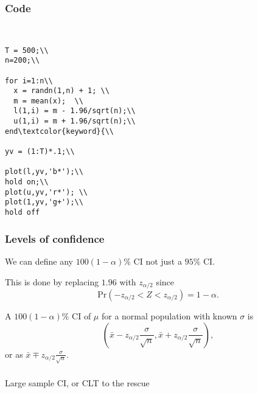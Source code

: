 \begin{frame}[fragile]\frametitle{Code}

{\tiny

\begin{lstlisting}


T = 500;\\
n=200;\\

for i=1:n\\
  x = randn(1,n) + 1; \\
  m = mean(x);  \\
  l(1,i) = m - 1.96/sqrt(n);\\
  u(1,i) = m + 1.96/sqrt(n);\\
end\textcolor{keyword}{\\

yv = (1:T)*.1;\\

plot(l,yv,'b*');\\
hold on;\\
plot(u,yv,'r*'); \\
plot(1,yv,'g+');\\
hold off

\end{lstlisting}

}

\end{frame}


\begin{frame}[fragile]\frametitle{Levels of confidence}

We can define any $100 (1-\alpha) \%$ CI not just a $95\%$ CI. \\ 

\vspace{.1in}

This is done by replacing $1.96$ with $z_{\alpha/2}$  since
$$\mbox{Pr}\left(-z_{\alpha/2} < Z < z_{\alpha/2}\right)  =
1-\alpha.$$ 

\begin{defn}
A $100 (1-\alpha) \%$ CI of $\mu$ for a normal population with known
$\sigma$ is 
$$\left(\bar{x} - z_{\alpha/2} \frac{\sigma}{\sqrt{n}}, \bar{x} + z_{\alpha/2} \frac{\sigma}{\sqrt{n}} \right),$$
or as $\bar{x} \mp z_{\alpha/2} \frac{\sigma}{\sqrt{n}}.$
\end{defn}

\end{frame}

\begin{frame}[fragile]\frametitle{}
\begin{center}
{\Large Large sample CI, or CLT to the rescue}

\end{center}
\end{frame}




